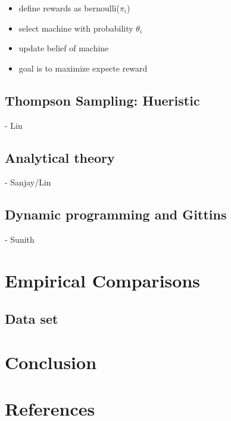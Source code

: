 \documentclass{article}
\begin{document}
\begin{itemize}
\item define rewards as bernoulli($\pi_i$)
\item select machine with probability $\theta_i$
\item update belief of machine
\item goal is to maximize expecte reward
\end{itemize}

\subsection{Thompson Sampling: Hueristic}

- Lin

\subsection{Analytical theory}

- Sanjay/Lin

\subsection{Dynamic programming and Gittins}

- Sunith


\section{Empirical Comparisons}

\subsection{Data set}

\section{Conclusion}

\section{References}
\end{document}
